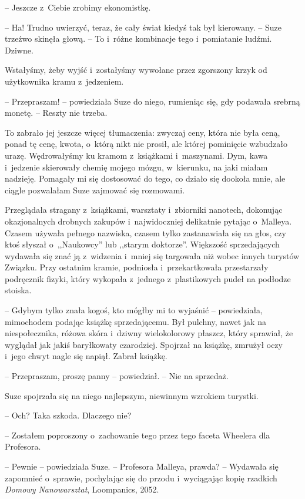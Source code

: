 \documentclass[oneside,polish,11pt,sfheadings]{mwbk}
\begin{document}
-- Jeszcze z~Ciebie zrobimy
ekonomistkę.

-- Ha! Trudno uwierzyć, teraz, że cały świat kiedyś tak był kierowany. -- Suze trzeźwo skinęła głową. -- To i~różne kombinacje tego i~pomiatanie
ludźmi. Dziwne.

Wstałyśmy, żeby wyjść i~zostałyśmy wywołane przez zgorszony krzyk od
użytkownika kramu z~jedzeniem.

-- Przepraszam! -- powiedziała Suze do niego, rumieniąc się, gdy podawała
srebrną monetę. -- Reszty nie trzeba.

To zabrało jej jeszcze więcej tłumaczenia: zwyczaj ceny, która nie była
ceną, ponad tę cenę, kwota, o~którą nikt nie prosił, ale której
pominięcie wzbudzało urazę. Wędrowałyśmy ku kramom z~książkami i~maszynami. Dym, kawa i~jedzenie skierowały chemię mojego mózgu, w~kierunku, na jaki miałam nadzieję. Pomagały mi się dostosować do tego,
co działo się dookoła mnie, ale ciągle pozwalałam Suze zajmować się
rozmowami.

Przeglądała stragany z~książkami, warsztaty i~zbiorniki nanotech,
dokonując okazjonalnych drobnych zakupów i~najwidoczniej delikatnie
pytając o~Malleya. Czasem używała pełnego nazwiska, czasem tylko
zastanawiała się na głos, czy ktoś słyszał o~,,Naukowcy'' lub ,,starym
doktorze''. Większość sprzedających wydawała się znać ją z~widzenia i~mniej się targowała niż wobec innych turystów Związku. Przy ostatnim
kramie, podniosła i~przekartkowała przestarzały podręcznik fizyki, który
wykopała z~jednego z~plastikowych pudeł na podłodze stoiska.

-- Gdybym tylko znała kogoś, kto mógłby mi to wyjaśnić -- powiedziała,
mimochodem podając książkę sprzedającemu. Był pulchny, nawet jak na
niespołecznika, różowa skóra i~dziwny wielokolorowy płaszcz, który
sprawiał, że wyglądał jak jakiś baryłkowaty czarodziej. Spojrzał na
książkę, zmrużył oczy i~jego chwyt nagle się napiął. Zabrał książkę.

-- Przepraszam, proszę panny -- powiedział. -- Nie na sprzedaż.

Suze spojrzała się na niego najlepszym, niewinnym wzrokiem turystki.

-- Och? Taka szkoda. Dlaczego nie?

-- Zostałem poproszony o~zachowanie tego przez tego faceta Wheelera dla
Profesora.

-- Pewnie -- powiedziała Suze. -- Profesora Malleya, prawda? -- Wydawała się
zapomnieć o~sprawie, pochylając się do przodu i~wyciągając kopię
rzadkich \textit{Domowy Nanowarsztat}, Loompanics, 2052. 
\end{document}
